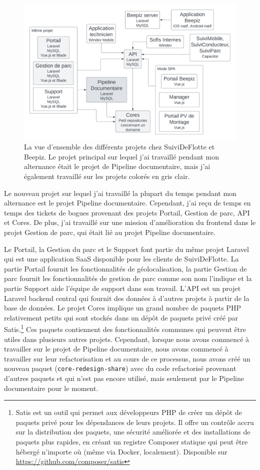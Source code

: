 \begin{figure}[ht]
    \centering
    \includegraphics[width=\textwidth]{img/present-architecture}
    \caption{La vue d'ensemble des différents projets chez SuiviDeFlotte et Beepiz. Le projet principal sur lequel j'ai travaillé pendant mon alternance était le projet de Pipeline documentaire, mais j'ai également travaillé sur les projets colorés en gris clair.}
    \label{fig:architecture}
\end{figure}

Le nouveau projet sur lequel j'ai travaillé la plupart du temps pendant mon alternance est le projet Pipeline documentaire. Cependant, j'ai reçu de temps en temps des tickets de bogues provenant des projets Portail, Gestion de parc, API et Cores. De plus, j'ai travaillé sur une mission d'amélioration du frontend dans le projet Gestion de parc, qui était lié au projet Pipeline documentaire.

Le Portail, la Gestion du parc et le Support font partie du même projet Laravel qui est une application SaaS disponible pour les clients de SuiviDeFlotte. La partie Portail fournit les fonctionnalités de géolocalisation, la partie Gestion de parc fournit les fonctionnalités de gestion de parc comme son nom l'indique et la partie Support aide l'équipe de support dans son travail. L'API est un projet Laravel backend central qui fournit des données à d'autres projets à partir de la base de données. Le projet Cores implique un grand nombre de paquets PHP relativement petits qui sont stockés dans un dépôt de paquets privé créé par Satis.\footnote{Satis est un outil qui permet aux développeurs PHP de créer un dépôt de paquets privé pour les dépendances de leurs projets. Il offre un contrôle accru sur la distribution des paquets, une sécurité améliorée et des installations de paquets plus rapides, en créant un registre Composer statique qui peut être hébergé n'importe où (même via Docker, localement). Disponible sur \url{https://github.com/composer/satis}} Ces paquets contiennent des fonctionnalités communes qui peuvent être utiles dans plusieurs autres projets. Cependant, lorsque nous avons commencé à travailler sur le projet de Pipeline documentaire, nous avons commencé à travailler sur leur refactorisation et au cours de ce processus, nous avons créé un nouveau paquet (\Verb|core-redesign-share|) avec du code refactorisé provenant d'autres paquets et qui n'est pas encore utilisé, mais seulement par le Pipeline documentaire pour le moment.